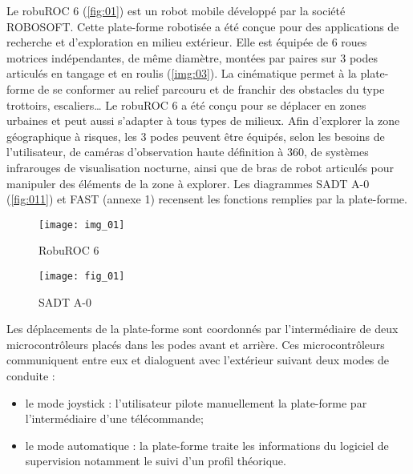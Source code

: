 \ifprof
\else
Le robuROC 6 (\autoref{fig:01}) est un robot mobile développé par la société ROBOSOFT. Cette plate-forme robotisée a été conçue pour des applications de recherche et d’exploration en milieu extérieur. Elle est équipée de 6 roues motrices indépendantes, de même diamètre, montées par paires sur 3 podes articulés en tangage et en roulis (\autoref{img:03}). La cinématique permet à la plate-forme de se conformer au relief parcouru et de franchir des obstacles du type trottoirs, escaliers… Le robuROC 6 a été conçu pour se déplacer en zones urbaines et peut aussi s’adapter à tous types de milieux.  Afin d’explorer la zone géographique à risques, les 3 podes peuvent être équipés, selon les besoins de l’utilisateur, de caméras d’observation haute définition à 360\degres, de systèmes infrarouges de visualisation nocturne, ainsi que de bras de robot articulés pour manipuler des éléments de la zone à explorer. Les diagrammes SADT A-0 (\autoref{fig:011}) et FAST (annexe 1) recensent les fonctions remplies par la plate-forme.


\begin{minipage}[c]{.47\linewidth}
\begin{figure}[H]
\centering
\texttt{[image: img\_01]}
\caption{RobuROC 6 \label{fig:01}}
\end{figure}
\end{minipage} \hfill
\begin{minipage}[c]{.47\linewidth}
\begin{figure}[H]
\centering
\texttt{[image: fig\_01]}
\caption{SADT A-0  \label{fig:011}}
\end{figure}
\end{minipage} 

\vspace{.5cm}

Les déplacements de la plate-forme sont coordonnés par l’intermédiaire de deux microcontrôleurs placés dans les podes avant et arrière. Ces microcontrôleurs communiquent entre eux et dialoguent avec l’extérieur suivant deux modes de conduite : 
\begin{itemize}
\item le mode joystick : l’utilisateur pilote manuellement la plate-forme par l’intermédiaire d’une télécommande;
\item le mode automatique : la plate-forme traite les informations du logiciel de supervision notamment le suivi d’un profil théorique.
\end{itemize}

